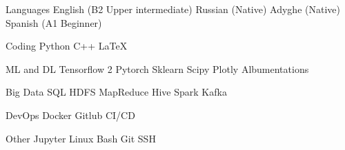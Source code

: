 

\begin{cvskills}
  \cvskill
  {Languages} %
  {English (B2 Upper intermediate) {\cdotp} Russian (Native) {\cdotp} Adyghe (Native) {\cdotp} Spanish (A1 Beginner)} %

  \cvskill
  {Coding} %
  {Python {\cdotp} C++ {\cdotp} LaTeX} %

  \cvskill
  {ML and DL} %
  {Tensorflow 2 {\cdotp} Pytorch {\cdotp} Sklearn {\cdotp} Scipy {\cdotp} Plotly {\cdotp} Albumentations} %

  \cvskill
  {Big Data} %
  {SQL {\cdotp} HDFS {\cdotp} MapReduce {\cdotp} Hive {\cdotp} Spark {\cdotp} Kafka} %

  \cvskill
  {DevOps} %
  {Docker {\cdotp} Gitlub CI/CD} %

  \cvskill
  {Other} %
  {Jupyter {\cdotp} Linux {\cdotp} Bash {\cdotp} Git {\cdotp} SSH} %

\end{cvskills}

